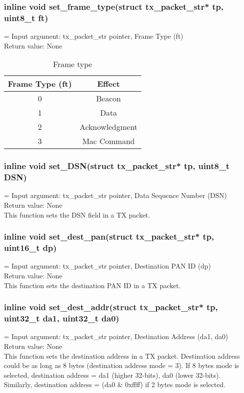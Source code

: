 \subsubsection{inline void set\_frame\_type(struct tx\_packet\_str* tp, uint8\_t ft)}
\hangindent=\parindent
{}
Input argument: tx\_packet\_str pointer, Frame Type (ft)\\
Return value: None\\
\begin{table}[h]
\centering
	\begin{tabular}{|c|c|}
	\hline
	{\bf Frame Type (ft)} & {\bf Effect}\\ \hline
	0 & Beacon\\ \hline
	1 & Data\\ \hline
	2 & Acknowledgment\\ \hline
	3 & Mac Command\\ \hline
	\end{tabular}
	\caption{Frame type}
\end{table}

\subsubsection{inline void set\_DSN(struct tx\_packet\_str* tp, uint8\_t DSN)}
\hangindent=\parindent
{}
Input argument: tx\_packet\_str pointer, Data Sequence Number (DSN)\\
Return value: None\\
This function sets the DSN field in a TX packet.


\subsubsection{inline void set\_dest\_pan(struct tx\_packet\_str* tp, uint16\_t dp)}
\hangindent=\parindent
{}
Input argument: tx\_packet\_str pointer, Destination PAN ID (dp)\\
Return value: None\\
This function sets the destination PAN ID in a TX packet.


\subsubsection{inline void set\_dest\_addr(struct tx\_packet\_str* tp, uint32\_t da1, uint32\_t da0)}
\hangindent=\parindent
{}
Input argument: tx\_packet\_str pointer, Destination Address (da1, da0)\\
Return value: None\\
This function sets the destination address in a TX packet. Destination address could be as
long as 8 bytes (destination address mode = 3). If 8 bytes mode is selected, destination
address = {da1 (higher 32-bits), da0 (lower 32-bits)}. Similarly, destination address = 
(da0 \& 0xffff) if 2 bytes mode is selected.

